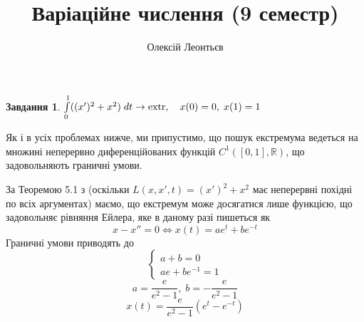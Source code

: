 \documentclass[12pt]{article} %
\title{Варіаційне числення (9 семестр)}
\author{Олексій Леонтьєв}
\newtheorem{prob}{Завдання}
\newcommand{\dt}{\;dt}
\newcommand{\extr}{\mbox{\normalfont extr}}
\begin{document}
\maketitle
\begin{prob}{}\; $\int_0^1((x')^2+x^2)\dt\to\extr,\quad x(0)=0,\;x(1)=1$\end{prob}
Як і в усіх проблемах нижче, ми припустимо, що пошук екстремума ведеться на множині неперервно диференційованих функцій $C^1([0,1],\mathbb{R})$,
що задовольняють граничні умови.

За Теоремою 5.1 з \cite{tb} (оскільки $L(x,x',t)=(x')^2+x^2$ має неперервні похідні по всіх аргументах)
маємо, що екстремум може досягатися лише функцією, що задовольняє рівняння Ейлера, яке в даному разі пишеться як
\[x-x''=0\iff x(t)=ae^t+be^{-t}\]
Граничні умови приводять до
\[\begin{cases}a+b=0\\ae+be^{-1}=1\end{cases}\]
\[a=\frac{e}{e^2-1},\;b=-\frac{e}{e^2-1}\]
\[x(t)=\frac{e}{e^2-1}(e^t-e^{-t})\]
\end{document}
